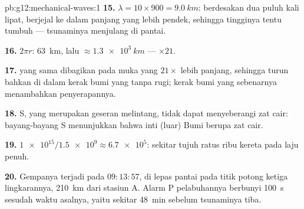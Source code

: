 \begin{solution}{pb:g12:mechanical-waves:1}
\textbf{15.} $\lambda = 10 \times 900 = \qty{9.0}{km}$: 
berdesakan dua puluh kali lipat,  berjejal ke dalam panjang
yang lebih pendek, sehingga tingginya tentu tumbuh --- tsunaminya
menjulang di pantai.

\textbf{16.} $2\pi r$: \qty{63}{km}, lalu $\approx \qty{1.3e3}{km}$
--- $\times 21$.

\textbf{17.}  yang sama dibagikan pada muka yang $21\times$ lebih
panjang, sehingga  turun bahkan di dalam kerak bumi yang
tanpa rugi; kerak bumi yang sebenarnya menambahkan penyerapannya.

\textbf{18.}  S, yang merupakan geseran melintang, tidak dapat
menyeberangi zat cair: bayang-bayang  S menunjukkan bahwa inti
(luar) Bumi berupa zat cair.

\textbf{19.} $\num{1e15}/\num{1.5e9} \approx \num{6.7e5}$: sekitar tujuh
ratus ribu kereta pada laju penuh.

\textbf{20.} Gempanya terjadi pada $09{:}13{:}57$, di lepas pantai pada
titik potong ketiga lingkarannya, \qty{210}{km} dari stasiun A. Alarm
 P pelabuhannya berbunyi \qty{100}{s} sesudah waktu asalnya,
yaitu sekitar \qty{48}{min} sebelum tsunaminya tiba.
\end{solution}

